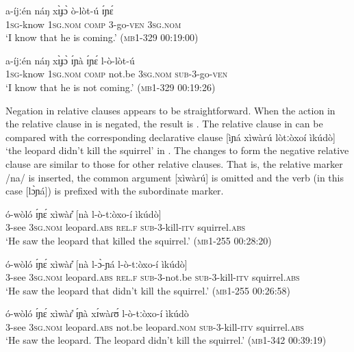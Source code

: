 \documentclass[output=paper,colorlinks,citecolor=brown,draftmode]{langscibook}
\begin{document}
\ea\label{ex:lop:54}
        \gll a-íjːén náŋ xɪ̀ɟɔ̀ ò-lòt-ú ɪ́ɲɛ́ \\ 
             1\textsc{sg}{}-know 1\textsc{sg.nom} \textsc{comp} 3-go-\textsc{ven} 3\textsc{sg.nom} \\
        \glt ‘I know that he is coming.’    (\textsc{mb1-329} \textsc{00}:19:00)
\z

\ea\label{ex:lop:55}
        \gll a-íjːén náŋ xɪ̀ɟɔ̀ ɪ́ɲà ɪ́ɲɛ́ l-ò-lòt-ú \\ 
             1\textsc{sg}{}-know \textsc{1sg.nom} \textsc{comp} not.be 3\textsc{sg.nom} \textsc{sub}{}-3-go-\textsc{ven} \\
        \glt ‘I know that he is not coming.’    (\textsc{mb1-329} 00:19:26)
\z

Negation in relative clauses appears to be straightforward. When the action in the relative clause in  is negated, the result is . The relative clause in  can be compared with the corresponding declarative clause [ìɲá xìwàrú lòtːòxoí ìkúdò] ‘the leopard didn’t kill the squirrel’ in . The changes to form the negative relative clause are similar to those for other relative clauses.  That is, the relative marker /na/ is inserted, the common argument [xìwàrú] is omitted and the verb (in this case [lɔ̀ɲá]) is prefixed with the subordinate marker.

\ea\label{ex:lop:56}
        \gll ó-wòló ɪ́ɲɛ́ xìwàɾ{\U} [nà l-ò-tːòxo-í ìkúdò]  \\
             3-see 3\textsc{sg.nom} leopard.\textsc{abs} \textsc{rel.f} \textsc{sub}{}-3-kill-\textsc{itv} squirrel.\textsc{abs} \\
        \glt ‘He saw the leopard that killed the squirrel.’     (\textsc{mb1-255} \textsc{00:}28:20)
\z

\ea\label{ex:lop:57}
        \gll ó-wòló ɪ́ɲɛ́ xìwàɾ{\U} [nà l-ɔ̀-ɲá l-ò-tːòxo-í ìkúdò] \\
             3-see 3\textsc{sg.nom} leopard.\textsc{abs} \textsc{rel.f} \textsc{sub-3-}not.be \textsc{sub}{}-3-kill-\textsc{itv} squirrel.\textsc{abs} \\
        \glt ‘He saw the leopard that didn’t kill the squirrel.’       (\textsc{mb1-255} \textsc{00}:26:58)
\z

\ea\label{ex:lop:58}
        \gll ó-wòló ɪ́ɲɛ́ xìwàɾ{\U} ɪ́ɲà xɪ́wàɾʊ́ l-ò-tːòxo-í ìkúdò \\
             3-see 3\textsc{sg.nom} leopard.\textsc{abs} not.be leopard.\textsc{nom} \textsc{sub}{}-3-kill-\textsc{itv} squirrel.\textsc{abs} \\
        \glt ‘He saw the leopard.  The leopard didn’t kill the squirrel.’ (\textsc{mb1-342} \textsc{00}:39:19)
\z
\end{document}
